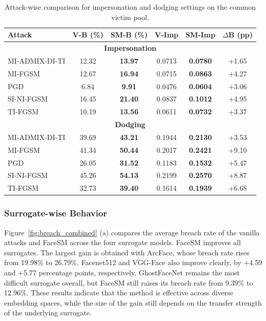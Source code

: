 \documentclass[a4paper,fleqn]{cas-dc}
\begin{document}
\begin{table}[t]
\centering
\caption{Attack-wise comparison for impersonation and dodging settings on the common victim pool.}
\label{tab:pairwise_split}
\setlength{\tabcolsep}{3pt}
\renewcommand{\arraystretch}{1.15}
\footnotesize
\begin{tabularx}{\columnwidth}{Xccccc}
\toprule
Attack & V-B (\%) & SM-B (\%) & V-Imp & SM-Imp & $\Delta$B (pp) \\
\midrule
\multicolumn{6}{c}{\textbf{Impersonation}} \\
\midrule
MI-ADMIX-DI-TI & 12.32 & \textbf{13.97} & 0.0713 & \textbf{0.0780} & +1.65 \\
MI-FGSM        & 12.67 & \textbf{16.94} & 0.0715 & \textbf{0.0863} & +4.27 \\
PGD            &  6.84 & \textbf{ 9.91} & 0.0476 & \textbf{0.0604} & +3.06 \\
SI-NI-FGSM     & 16.45 & \textbf{21.40} & 0.0837 & \textbf{0.1012} & +4.95 \\
TI-FGSM        & 10.19 & \textbf{13.56} & 0.0611 & \textbf{0.0732} & +3.37 \\
\midrule
\multicolumn{6}{c}{\textbf{Dodging}} \\
\midrule
MI-ADMIX-DI-TI & 39.69 & \textbf{43.21} & 0.1944 & \textbf{0.2130} & +3.53 \\
MI-FGSM        & 41.34 & \textbf{50.44} & 0.2017 & \textbf{0.2421} & +9.10 \\
PGD            & 26.05 & \textbf{31.52} & 0.1183 & \textbf{0.1532} & +5.47 \\
SI-NI-FGSM     & 45.26 & \textbf{54.13} & 0.2199 & \textbf{0.2570} & +8.87 \\
TI-FGSM        & 32.73 & \textbf{39.40} & 0.1614 & \textbf{0.1939} & +6.68 \\
\bottomrule
\end{tabularx}
\end{table}

\subsubsection{Surrogate-wise Behavior}

Figure~\ref{fig:breach_combined} (a) compares the average breach rate of the vanilla attacks and FaceSM across the four surrogate models. FaceSM improves all surrogates. The largest gain is obtained with ArcFace, whose breach rate rises from 19.98\% to 26.79\%. Facenet512 and VGG-Face also improve clearly, by +4.59 and +5.77 percentage points, respectively. GhostFaceNet remains the most difficult surrogate overall, but FaceSM still raises its breach rate from 9.39\% to 12.96\%. These results indicate that the method is effective across diverse embedding spaces, while the size of the gain still depends on the transfer strength of the underlying surrogate.
\end{document}
